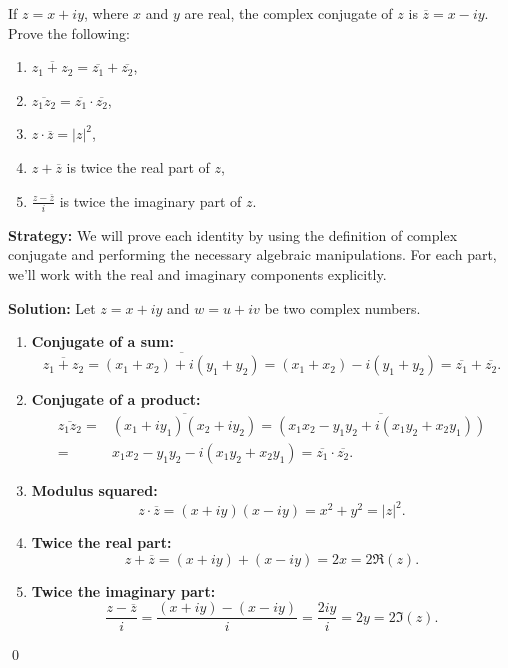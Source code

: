 \begin{problembox}
\begin{problemstatement}
If \( z = x + iy \), where \( x \) and \( y \) are real, the complex conjugate of \( z \) is \( \overline{z} = x - iy \). Prove the following:
\begin{enumerate}[label=\alph*)]
\item \( \overline{z_1 + z_2} = \overline{z_1} + \overline{z_2} \),
\item \( \overline{z_1 z_2} = \overline{z_1} \cdot \overline{z_2} \),
\item \( z \cdot \overline{z} = |z|^2 \),
\item \( z + \overline{z} \) is twice the real part of \( z \),
\item \( \frac{z - \overline{z}}{i} \) is twice the imaginary part of \( z \).
\end{enumerate}
\end{problemstatement}
\end{problembox}

\noindent\textbf{Strategy:} We will prove each identity by using the definition of complex conjugate and performing the necessary algebraic manipulations. For each part, we'll work with the real and imaginary components explicitly.

\bigskip\noindent\textbf{Solution:}
Let \( z = x + iy \) and \( w = u + iv \) be two complex numbers.

\begin{enumerate}[label=\alph*)]

\item \textbf{Conjugate of a sum:}
\[
\overline{z_1 + z_2} = \overline{(x_1 + x_2) + i(y_1 + y_2)} = (x_1 + x_2) - i(y_1 + y_2) = \overline{z_1} + \overline{z_2}.
\]

\item \textbf{Conjugate of a product:}
\begin{align*}
\overline{z_1 z_2} =& \overline{(x_1 + iy_1)(x_2 + iy_2)} = \overline{(x_1 x_2 - y_1 y_2 + i(x_1 y_2 + x_2 y_1))} \\
=& x_1 x_2 - y_1 y_2 - i(x_1 y_2 + x_2 y_1) = \overline{z_1} \cdot \overline{z_2}.
\end{align*}
\item \textbf{Modulus squared:}
\[
z \cdot \overline{z} = (x + iy)(x - iy) = x^2 + y^2 = |z|^2.
\]

\item \textbf{Twice the real part:}
\[
z + \overline{z} = (x + iy) + (x - iy) = 2x = 2 \Re(z).
\]

\item \textbf{Twice the imaginary part:}
\[
\frac{z - \overline{z}}{i} = \frac{(x + iy) - (x - iy)}{i} = \frac{2iy}{i} = 2y = 2 \Im(z).
\]

\end{enumerate}\qed


